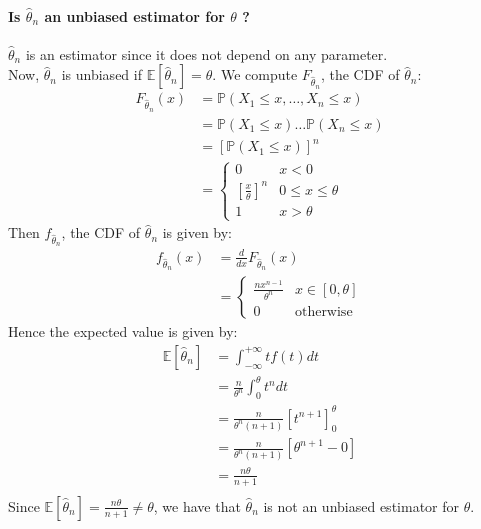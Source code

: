 \documentclass{article}
\renewcommand{\P}{\mathbb{P}}
\newcommand{\E}{\mathbb{E}}
\newcommand{\thetahat}{\hat\theta}
\begin{document}
\paragraph{Is \(\hat\theta_n\) an unbiased estimator for \(\theta\) ?\\}
\(\hat\theta_n\) is an estimator since it does not depend on any parameter.\\
Now, \(\hat\theta_n\) is unbiased if \(\E[\hat\theta_n] = \theta\). We compute \(F_{\thetahat_n}\), the CDF of \(\hat\theta_n\):
\begin{align*}
    F_{\thetahat_n}(x)
     & = \P(X_1 \leq x, \ldots, X_n \leq x)   \\
     & = \P(X_1 \leq x) \ldots \P(X_n \leq x) \\
     & = \left[\P(X_1 \leq x)\right]^n        \\
     & = \begin{cases}
        0                                 & x < 0                \\
        \left[ \frac{x}{\theta} \right]^n & 0 \leq x \leq \theta \\
        1                                 & x > \theta
    \end{cases}
\end{align*}
Then \(f_{\thetahat_n}\), the CDF of \(\thetahat_n\) is given by:
\begin{align*}
    f_{\thetahat_n}(x)
     & = \frac{d}{dx} F_{\thetahat_n}(x) \\
     & =
    \begin{cases}
        \frac{n x^{n-1}}{\theta^n} & x \in [0, \theta] \\
        0                          & \text{otherwise}
    \end{cases}
\end{align*}
Hence the expected value is given by:
\begin{align*}
    \E[\hat\theta_n]
     & = \int_{-\infty}^{+\infty} t f(t) dt                         \\
     & = \frac{n}{\theta^n} \int_{0}^{\theta} t^n dt                \\
     & = \frac{n}{\theta^n (n+1)} \left[t^{n+1}\right]_{0}^{\theta} \\
     & = \frac{n}{\theta^n (n+1)} \left[ \theta^{n+1} - 0 \right]   \\
     & = \frac{n \theta}{n+1}                                       \\
\end{align*}
Since \(\E[\hat\theta_n] = \frac{n \theta}{n+1} \neq \theta\), we have that \(\thetahat_n\) is not an unbiased estimator for \(\theta\).
\end{document}
